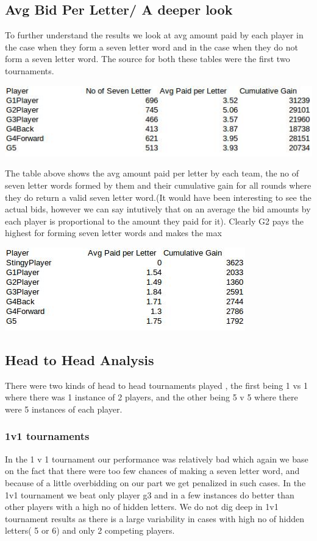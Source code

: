 \documentclass[11pt]{article}
\begin{document}
	\subsection{Avg Bid Per Letter/ A deeper look}
	To further understand the results we look at avg amount paid by each player in the case when they form a seven letter word and in the case when they do not form a seven letter word. The source for both these tables were the first two tournaments. 
	\begin{center}
\includegraphics[width=0.8 \textwidth]{AVGBidSevenY}
\end{center}
The table above shows the avg amount paid per letter by each team, the no of seven letter words formed by them and their cumulative gain for all rounds where they do return a valid seven letter word.(It would have been interesting to see the actual bids, however we can say intutively that on an average the bid amounts by each player is proportional to the amount they paid for it). Clearly G2 pays the highest for forming seven letter words and makes the max  
	\begin{center}
\includegraphics[width=0.6 \textwidth]{AVGBidSevenN}
\end{center}
	\subsection{Head to Head Analysis}
	There were two kinds of head to head tournaments played , the first being 1 vs 1 where there was 1 instance of 2 players, and the other being 5 v 5 where there were 5 instances of each player. 

\subsubsection{1v1 tournaments}	
	In the 1 v 1 tournament our performance was relatively bad which again we base on the fact that there were too few chances of making a seven letter word, and because of a little overbidding on our part we get penalized in such cases. In the 1v1 tournament we beat only player g3 and in a few instances do better than other players with a high no of hidden letters. We do not dig deep in 1v1 tournament results as there is a large variability in cases with high no of hidden letters( 5 or 6) and only 2 competing players. 
\end{document}
